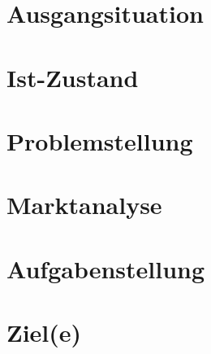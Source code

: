 \section{Ausgangsituation}
\section{Ist-Zustand}
\section{Problemstellung}
\section{Marktanalyse}
\section{Aufgabenstellung}
\section{Ziel(e)}
